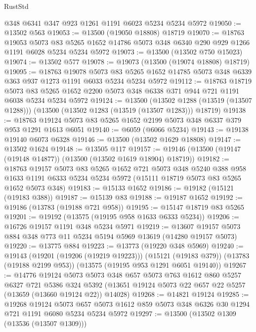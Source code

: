 \begin{lexlean}{RustStd}
\begin{coremodule}
    @348
    @6341
    @347
    @923
    @1261
    @1191
    @6023
    @5234
    @5234
    @5972
@19050 := @13502 @563
@19053 := @13500 (@19050 @18808) @18719
@19070 := @18763
    @19053
    @5073
    @83
    @5265
    @1652
    @14786
    @5073
    @348
    @6340
    @290
    @929
    @1266
    @1191
    @6028
    @5234
    @5234
    @5972
@19073 := @13500 (@13502 @750 @15023)
@19074 := @13502 @577
@19078 := @19073 (@13500 (@19074 @18808) @18719)
@19095 := @18763
    @19078
    @5073
    @83
    @5265
    @1652
    @14785
    @5073
    @348
    @6339
    @363
    @937
    @1273
    @1191
    @6033
    @5234
    @5234
    @5972
@19112 := @18763
    @18719
    @5073
    @83
    @5265
    @1652
    @2200
    @5073
    @348
    @6338
    @371
    @944
    @721
    @1191
    @6038
    @5234
    @5234
    @5972
@19124 := @13500
    (@13502 @1288 (@13519 (@13507 @1288)))
    (@13500 (@13502 @1283 (@13519 (@13507 @1283))) @18719)
@19138 := @18763 @19124 @5073 @83 @5265 @1652 @2199 @5073 @348 @6337 @379 @953 @1291 @1613 @6051
@19140 := @6059 (@6066 @5234)
@19143 := @19138 @19140 @6073 @6328
@19146 := @13500 (@13502 @1629 @18808)
@19147 := @13502 @1624
@19148 := @13505 @117
@19157 := @19146 (@13500 (@19147 (@19148 @14877)) (@13500 (@13502 @1619 @18904) @18719))
@19182 := @18763
    @19157
    @5073
    @83
    @5265
    @1652
    @721
    @5073
    @348
    @5240
    @388
    @958
    @1633
    @1191
    @6333
    @5234
    @5234
    @5972
    (@15111 @18719 @5073 @83 @5265 @1652 @5073 @348)
@19183 := @15133 @1652
@19186 := @19182 (@15121 (@19183 @388))
@19187 := @15139 @83
@19188 := @19187 @1652
@19192 := @19186 (@13783 (@19188 @721 @958))
@19195 := @15147 @18719 @83 @5265
@19201 := @19192 (@13575 (@19195 @958 @1633 @6333 @5234))
@19206 := @16726 @19157 @1191 @348 @5234 @5971
@19219 := @13607 @19157 @5073 @884 @348 @773 @11 @5234 @5194 @5969 @13619 (@14280 @19157 @5073)
@19220 := @13775 @884
@19223 := @13773 (@19220 @348 @5969)
@19240 := @19143
    (@19201 (@19206 (@19219 @19223)))
    (@15121 (@19183 @379))
    (@13783 (@19188 @2199 @953))
    (@13575 (@19195 @953 @1291 @6051 @19140))
@19267 := @14776
    @19124
    @5073
    @5073
    @348
    @657
    @5073
    @763
    @1612
    @860
    @5257
    @6327
    @721
    @5386
    @324
    @5392
    (@13651 @19124 @5073 @22 @657 @22 @5257 (@13659 (@13660 @19124 @22)) @14028)
@19268 := @14821 @19124
@19285 := @19268
    @19124
    @5073
    @657
    @5073
    @1612
    @859
    @5073
    @348
    @6326
    @30
    @1294
    @721
    @1191
    @6080
    @5234
    @5234
    @5972
@19297 := @13500
    (@13502 @1309 (@13536 (@13507 @1309)))

\end{coremodule}
\end{lexlean}
